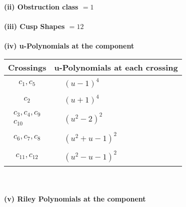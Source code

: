 \documentclass[1p]{elsarticle_modified}
\theoremstyle{definition}
\begin{document}
\flushleft \textbf{(ii) Obstruction class $= 1$}\\~\\
\flushleft \textbf{(iii) Cusp Shapes $= 12$}\\~\\
\newpage\renewcommand{\arraystretch}{1}
\flushleft \textbf{(iv) u-Polynomials at the component}\newline \\
\begin{tabular}{m{50pt}|m{274pt}}
Crossings & \hspace{64pt}u-Polynomials at each crossing \\
\hline $$\begin{aligned}c_{1},c_{5}\end{aligned}$$&$\begin{aligned}
&(u-1)^4
\end{aligned}$\\
\hline $$\begin{aligned}c_{2}\end{aligned}$$&$\begin{aligned}
&(u+1)^4
\end{aligned}$\\
\hline $$\begin{aligned}c_{3},c_{4},c_{9}\\c_{10}\end{aligned}$$&$\begin{aligned}
&(u^2-2)^2
\end{aligned}$\\
\hline $$\begin{aligned}c_{6},c_{7},c_{8}\end{aligned}$$&$\begin{aligned}
&(u^2+u-1)^2
\end{aligned}$\\
\hline $$\begin{aligned}c_{11},c_{12}\end{aligned}$$&$\begin{aligned}
&(u^2- u-1)^2
\end{aligned}$\\
\hline
\end{tabular}\\~\\
\newpage\renewcommand{\arraystretch}{1}
\flushleft \textbf{(v) Riley Polynomials at the component}\newline \\
\end{document}
